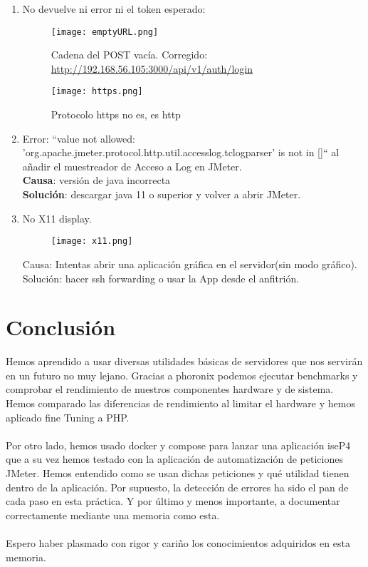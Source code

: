 \begin{enumerate}
		\item No devuelve ni error ni el token esperado:
	\begin{figure}[H]
		\centering
		\texttt{[image: emptyURL.png]}
		\caption{Cadena del POST vacía. Corregido: \url{http://192.168.56.105:3000/api/v1/auth/login}}
	\end{figure}
	\begin{figure}[H]
		\centering
		\texttt{[image: https.png]}
		\caption{Protocolo https no es, es http}
	\end{figure}

	\item Error: ``value not allowed: 'org.apache.jmeter.protocol.http.util.accesslog.tclogparser' is not in []`` al añadir el muestreador de Acceso a Log en JMeter.\\
	\textbf{Causa}: versión de java incorrecta\\
	\textbf{Solución}: descargar java 11 o superior y volver a abrir JMeter.
	
	\item No X11 display.
	\begin{figure}[H]
		\centering
		\texttt{[image: x11.png]}
	\end{figure}
	Causa: Intentas abrir una aplicación gráfica en el servidor(sin modo gráfico). \\
	Solución: hacer ssh forwarding o usar la App desde el anfitrión.
\end{enumerate}

\newpage

\section{Conclusión}
Hemos aprendido a usar diversas utilidades básicas de servidores que nos servirán en un futuro no muy lejano. Gracias a phoronix podemos ejecutar benchmarks y comprobar el rendimiento de nuestros componentes hardware y de sistema. Hemos comparado las diferencias de rendimiento al limitar el hardware y hemos aplicado fine Tuning a PHP. 
\\\\
Por otro lado, hemos usado docker y compose para lanzar una aplicación iseP4 que a su vez hemos testado con la aplicación de automatización de peticiones JMeter. Hemos entendido como se usan dichas peticiones y qué utilidad tienen dentro de la aplicación. Por supuesto, la detección de errores ha sido el pan de cada paso en esta práctica. 
Y por último y menos importante, a documentar correctamente mediante una memoria como esta.
 \\\\
Espero haber plasmado con rigor y cariño los conocimientos adquiridos en esta memoria. 
\newpage



